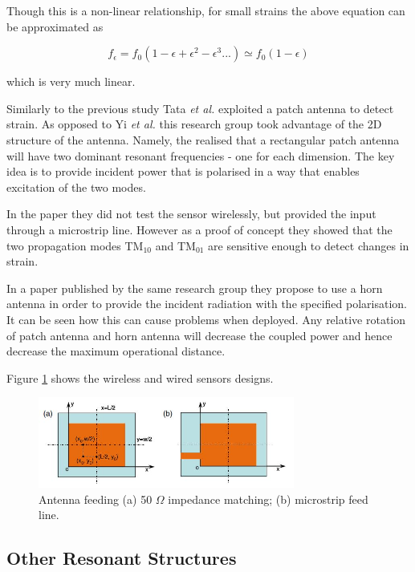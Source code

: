 \documentclass[11pt,a4paper]{article}
\begin{document}
Though this is a non-linear relationship, for small strains the above equation can be approximated as

\begin{equation}
f_{\epsilon} = f_0(1-\epsilon+\epsilon ^2-\epsilon ^3 ... ) \simeq f_0(1-\epsilon)
\end{equation}

which is very much linear.

Similarly to the previous study Tata \textit{et al.} \cite{patch} exploited a patch antenna to detect strain. As opposed to Yi \textit{et al.} this research group took advantage of the 2D structure of the antenna. Namely, the realised that a rectangular patch antenna will have two dominant resonant frequencies  - one for each dimension. The key idea is to provide incident power that is polarised in a way that enables excitation of the two modes.

In the paper they did not test the sensor wirelessly, but provided the input through a microstrip line. However as a proof of concept they showed that the two propagation modes TM$_{10}$ and TM$_{01}$ are sensitive enough to detect changes in strain.

In a paper \cite{horn} published by the same research group they propose to use a horn antenna in order to provide the incident radiation with the specified polarisation. It can be seen how this can cause problems when deployed. Any relative rotation of patch antenna and horn antenna will decrease the coupled power and hence decrease the maximum operational distance.

Figure \ref{fig:patch} shows the wireless and wired sensors designs.

\begin{figure}[h]
\centering
\includegraphics[width=0.75\textwidth]{patch.JPG}
\caption{Antenna feeding (a) 50 $\Omega$ impedance matching; (b) microstrip feed line.\cite{horn}\label{fig:patch}}
\end{figure}

\subsection{Other Resonant Structures}
\end{document}
